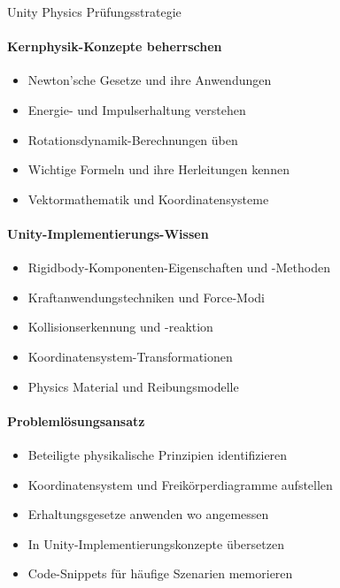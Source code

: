\begin{KR}{Unity Physics Prüfungsstrategie}
    \paragraph{Kernphysik-Konzepte beherrschen}
    \begin{itemize}
        \item Newton'sche Gesetze und ihre Anwendungen
        \item Energie- und Impulserhaltung verstehen
        \item Rotationsdynamik-Berechnungen üben
        \item Wichtige Formeln und ihre Herleitungen kennen
        \item Vektormathematik und Koordinatensysteme
    \end{itemize}
    
    \paragraph{Unity-Implementierungs-Wissen}
    \begin{itemize}
        \item Rigidbody-Komponenten-Eigenschaften und -Methoden
        \item Kraftanwendungstechniken und Force-Modi
        \item Kollisionserkennung und -reaktion
        \item Koordinatensystem-Transformationen
        \item Physics Material und Reibungsmodelle
    \end{itemize}
    
    \paragraph{Problemlösungsansatz}
    \begin{itemize}
        \item Beteiligte physikalische Prinzipien identifizieren
        \item Koordinatensystem und Freikörperdiagramme aufstellen
        \item Erhaltungsgesetze anwenden wo angemessen
        \item In Unity-Implementierungskonzepte übersetzen
        \item Code-Snippets für häufige Szenarien memorieren
    \end{itemize}
    

\end{KR}
